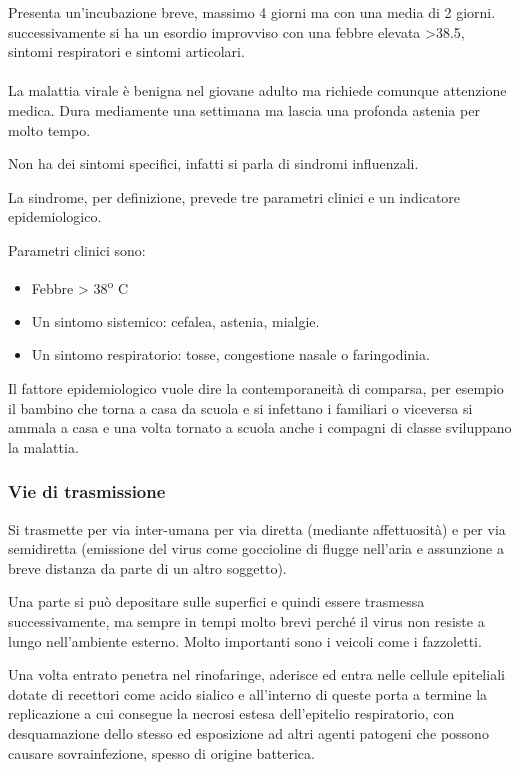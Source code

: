 Presenta un'incubazione breve, massimo 4 giorni ma con una media di 2
giorni. successivamente si ha un esordio improvviso con una febbre
elevata \textgreater{}38.5, sintomi respiratori e sintomi articolari.
\\\\
La malattia virale è benigna nel giovane adulto ma richiede comunque
attenzione medica. Dura mediamente una settimana ma lascia una profonda
astenia per molto tempo.

Non ha dei sintomi specifici, infatti si parla di sindromi influenzali.

La sindrome, per definizione, prevede tre parametri clinici e un
indicatore epidemiologico.

Parametri clinici sono:
\begin{itemize}

\item Febbre \textgreater{} 38\textsuperscript{o} C

\item Un sintomo sistemico: cefalea, astenia, mialgie.

\item  Un sintomo respiratorio: tosse, congestione nasale o faringodinia.
\end{itemize}
Il fattore epidemiologico vuole dire la contemporaneità di comparsa, per
esempio il bambino che torna a casa da scuola e si infettano i familiari
o viceversa si ammala a casa e una volta tornato a scuola anche i
compagni di classe sviluppano la malattia.

\subsubsection{Vie di trasmissione}


Si trasmette per via inter-umana per via diretta (mediante affettuosità)
e per via semidiretta (emissione del virus come goccioline di flugge
nell'aria e assunzione a breve distanza da parte di un altro soggetto).

Una parte si può depositare sulle superfici e quindi essere trasmessa
successivamente, ma sempre in tempi molto brevi perché il virus non
resiste a lungo nell'ambiente esterno. Molto importanti sono i veicoli
come i fazzoletti.

Una volta entrato penetra nel rinofaringe, aderisce ed entra nelle
cellule epiteliali dotate di recettori come acido sialico e all'interno
di queste porta a termine la replicazione a cui consegue la necrosi
estesa dell'epitelio respiratorio, con desquamazione dello stesso ed
esposizione ad altri agenti patogeni che possono causare sovrainfezione,
spesso di origine batterica.


